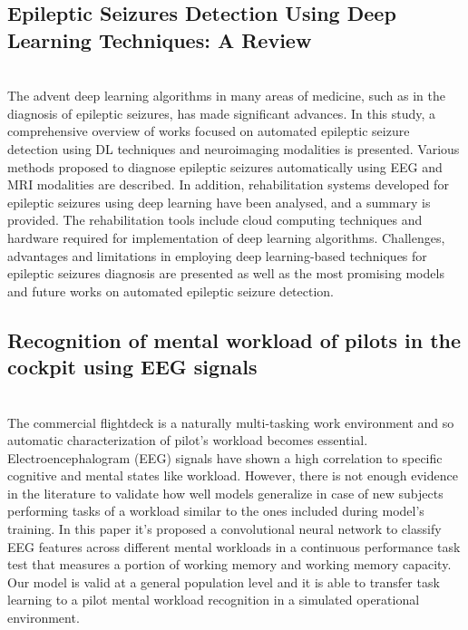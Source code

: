 \subsection{Epileptic Seizures Detection Using Deep Learning Techniques: A Review}
\leavevmode\\
The advent deep learning algorithms in many areas of medicine, such as in the diagnosis of epileptic seizures, has made significant advances. In this study, a comprehensive overview of works focused on automated epileptic seizure detection using DL techniques and neuroimaging modalities is presented. Various methods proposed to diagnose epileptic seizures automatically using EEG and MRI modalities are described. In addition, rehabilitation systems developed for epileptic seizures using deep learning have been analysed, and a summary is provided. The rehabilitation tools include cloud computing techniques and hardware required for implementation of deep learning algorithms. Challenges, advantages and limitations in employing deep learning-based techniques for epileptic seizures diagnosis are presented as well as the most promising models and future works on automated epileptic seizure detection.
\\

\subsection{Recognition of mental workload of pilots in the cockpit using EEG signals}
\leavevmode\\
The commercial flightdeck is a naturally multi-tasking work environment and so automatic characterization of pilot’s workload becomes essential. Electroencephalogram (EEG) signals have shown a high correlation to specific cognitive and mental states like workload. However, there is not enough evidence in the literature to validate how well models generalize in case of new subjects performing tasks of a workload similar to the ones included during model’s training. In this paper it’s proposed a convolutional neural network to classify EEG features across different mental workloads in a continuous performance task test that measures a portion of working memory and working memory capacity. Our model is valid at a general population level and it is able to transfer task learning to a pilot mental workload recognition in a simulated operational environment.
\\